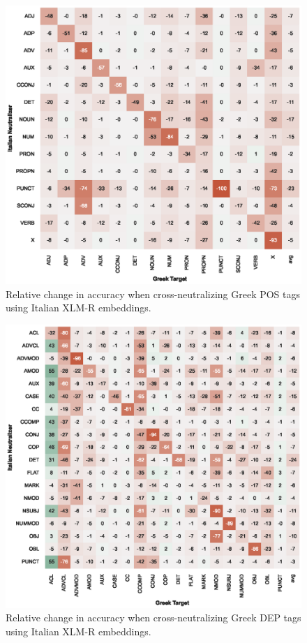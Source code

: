 \documentclass[11pt,a4paper]{article}
\begin{document}
\begin{figure}[t]
    \centering
    \includegraphics{full_figures/POS-crosslingual-el_gdt_from_it_vit-accdrop.eps}
    \caption{Relative change in accuracy when cross-neutralizing Greek POS tags using Italian XLM-R embeddings.}
    \label{fig:xlingual_xneutr_pos_el_gdt_from_it_vit}
\end{figure}

\begin{figure}[t]
    \centering
    \includegraphics{full_figures/DEP-crosslingual-el_gdt_from_it_vit-accdrop.eps}
    \caption{Relative change in accuracy when cross-neutralizing Greek DEP tags using Italian XLM-R embeddings.}
    \label{fig:xlingual_xneutr_dep_el_gdt_from_it_vit}
\end{figure}
\end{document}

